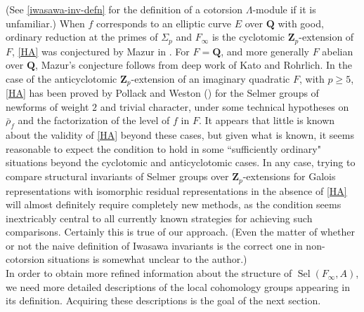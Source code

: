 \documentclass[12 pt]{amsart}
\theoremstyle{plain}
\theoremstyle{definition}
\numberwithin{equation}{section}
\numberwithin{table}{section}
\begin{document}
(See \cref{iwasawa-inv-defn} for the definition of a cotorsion $\Lambda$-module if it is unfamiliar.) When $f$ corresponds to an elliptic curve $E$ over $\mathbf{Q}$ with good, ordinary reduction at the primes of $\Sigma_p$ and $F_\infty$ is the cyclotomic $\mathbf{Z}_p$-extension of $F$, \cref{HA} was conjectured by Mazur in \cite{M}. For $F=\mathbf{Q}$, and more generally $F$ abelian over $\mathbf{Q}$, Mazur's conjecture follows from deep work of Kato and Rohrlich. In the case of the anticyclotomic $\mathbf{Z}_p$-extension of an imaginary quadratic $F$, with $p\geq 5$, \cref{HA} has been proved by Pollack and Weston (\cite[Theorem 1.3]{PW11}) for the Selmer groups of newforms of weight $2$ and trivial character, under some technical hypotheses on $\bar{\rho}_f$ and the factorization of the level of $f$ in $F$. It appears that little is known about the validity of \cref{HA} beyond these cases, but given what is known, it seems reasonable to expect the condition to hold in some ``sufficiently ordinary" situations beyond the cyclotomic and anticyclotomic cases. In any case, trying to compare structural invariants of Selmer groups over $\mathbf{Z}_p$-extensions for Galois representations with isomorphic residual representations in the absence of \cref{HA} will almost definitely require completely new methods, as the condition seems inextricably central to all currently known strategies for achieving such comparisons. Certainly this is true of our approach. (Even the matter of whether or not the naive definition of Iwasawa invariants is the correct one in non-cotorsion situations is somewhat unclear to the author.)\\%
\indent In order to obtain more refined information about the structure of $\operatorname{Sel}(F_\infty,A)$, we need more detailed descriptions of the local cohomology groups appearing in its definition. Acquiring these descriptions is the goal of the next section.
\end{document}
